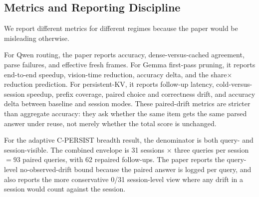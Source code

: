 \subsection{Metrics and Reporting Discipline}

We report different metrics for different regimes because the paper would be
misleading otherwise.

For Qwen routing, the paper reports accuracy, dense-versus-cached agreement,
parse failures, and effective fresh frames. For Gemma first-pass pruning, it
reports end-to-end speedup, vision-time reduction, accuracy delta, and the
share$\times$reduction prediction. For persistent-KV, it reports follow-up
latency, cold-versus-session speedup, prefix coverage, paired choice and
correctness drift, and accuracy delta between baseline and session modes. These
paired-drift metrics are stricter than aggregate accuracy: they ask whether the
same item gets the same parsed answer under reuse, not merely whether the total
score is unchanged.

For the adaptive C-PERSIST breadth result, the denominator is both query- and
session-visible. The combined envelope is 31 sessions \(\times\) three queries
per session \(=93\) paired queries, with 62 repaired follow-ups. The paper
reports the query-level no-observed-drift bound because the paired answer is
logged per query, and also reports the more conservative 0/31 session-level
view where any drift in a session would count against the session.
